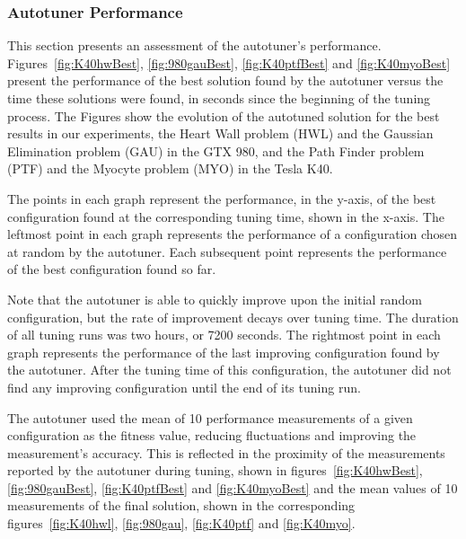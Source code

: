 \subsubsection{Autotuner Performance}

This section presents an assessment of the autotuner's performance.
Figures~\ref{fig:K40hwBest}, \ref{fig:980gauBest}, \ref{fig:K40ptfBest} and
\ref{fig:K40myoBest} present the performance of the best solution found by the
autotuner versus the time these solutions were found, in seconds since the
beginning of the tuning process. The Figures show the evolution of the
autotuned solution for the best results in our experiments, the Heart Wall
problem (HWL) and the Gaussian Elimination problem (GAU) in the GTX 980, and
the Path Finder problem (PTF) and the Myocyte problem (MYO) in the Tesla K40.

The points in each graph represent the performance, in the y-axis, of the best
configuration found at the corresponding tuning time, shown in the x-axis. The
leftmost point in each graph represents the performance of a configuration
chosen at random by the autotuner. Each subsequent point represents the
performance of the best configuration found so far.

Note that the autotuner is able to quickly improve upon the initial random
configuration, but the rate of improvement decays over tuning time. The
duration of all tuning runs was two hours, or 7200 seconds.  The rightmost
point in each graph represents the performance of the last improving
configuration found by the autotuner. After the tuning time of this
configuration, the autotuner did not find any improving configuration until the
end of its tuning run.

The autotuner used the mean of 10 performance measurements of a given
configuration as the fitness value, reducing fluctuations and improving the
measurement's accuracy. This is reflected in the proximity of the measurements
reported by the autotuner during tuning, shown in figures~\ref{fig:K40hwBest},
\ref{fig:980gauBest}, \ref{fig:K40ptfBest} and \ref{fig:K40myoBest} and the
mean values of 10 measurements of the final solution, shown in the
corresponding figures~\ref{fig:K40hwl}, \ref{fig:980gau}, \ref{fig:K40ptf} and
\ref{fig:K40myo}.

